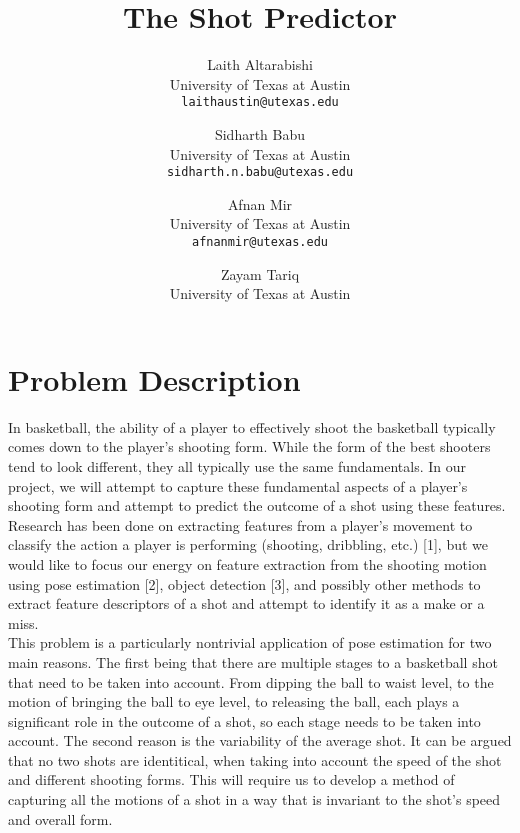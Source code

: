 \documentclass[10pt,twocolumn,letterpaper]{article}
\begin{document}
\title{The Shot Predictor}

\author{Laith Altarabishi\\
University of Texas at Austin\\
{\tt\small laithaustin@utexas.edu}
\and
Sidharth Babu\\
University of Texas at Austin\\
{\tt\small sidharth.n.babu@utexas.edu}
\and
Afnan Mir \\
University of Texas at Austin\\
{\tt\small afnanmir@utexas.edu}
\and
Zayam Tariq \\
University of Texas at Austin\\
{\tt{}}
}
\maketitle


\section{Problem Description}
\label{sec:intro}

In basketball, the ability of a player to effectively shoot the basketball typically comes down to the player’s shooting form. While the form of the best shooters tend to look different, they all typically use the same fundamentals. In our project, we will attempt to capture these fundamental aspects of a player’s shooting form and attempt to predict the outcome of a shot using these features. Research has been done on extracting features from a player’s movement to classify the action a player is performing (shooting, dribbling, etc.) [1], but we would like to focus our energy on feature extraction from the shooting motion using pose estimation [2], object detection [3], and possibly other methods to extract feature descriptors of a shot and attempt to identify it as a make or a miss.\\
\indent This problem is a particularly nontrivial application of pose estimation for two main reasons. The first being that there are multiple stages to
a basketball shot that need to be taken into account. From dipping the ball to waist level, to the motion of bringing the ball to eye level, to releasing the ball, each
plays a significant role in the outcome of a shot, so each stage needs to be taken into account. The second reason is the variability of the average shot. It can be argued that no two shots are identitical, when taking into account the speed of the shot
and different shooting forms. This will require us to develop a method of capturing all the motions of a shot in a way that is invariant to the shot's speed and overall form.
\end{document}
